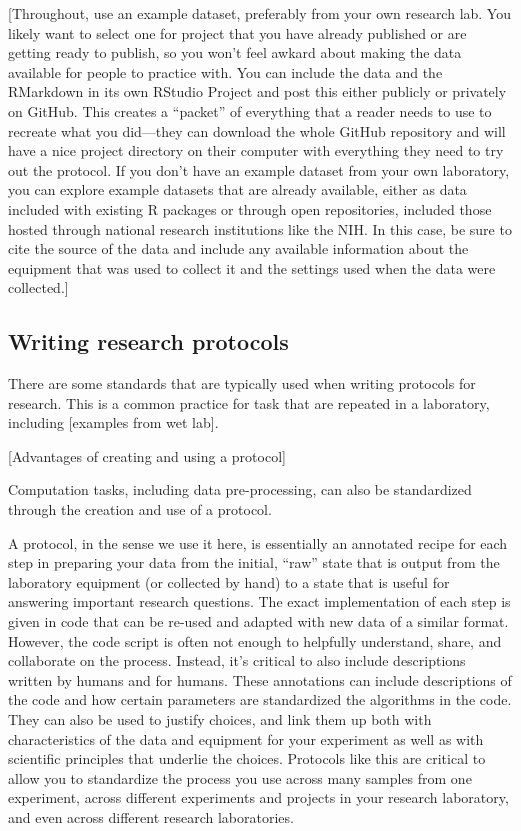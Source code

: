 \documentclass[]{tufte-book}
\begin{document}
{[}Throughout, use an example dataset, preferably from your own research lab. You
likely want to select one for project that you have already published or are
getting ready to publish, so you won't feel awkard about making the data
available for people to practice with. You can include the data and the
RMarkdown in its own RStudio Project and post this either publicly or privately
on GitHub. This creates a ``packet'' of everything that a reader needs to use to
recreate what you did---they can download the whole GitHub repository and will
have a nice project directory on their computer with everything they need to try
out the protocol. If you don't have an example dataset from your own laboratory,
you can explore example datasets that are already available, either as data
included with existing R packages or through open repositories, included those
hosted through national research institutions like the NIH. In this case, be
sure to cite the source of the data and include any available information about
the equipment that was used to collect it and the settings used when the data
were collected.{]}

\hypertarget{writing-research-protocols}{%
\subsection{Writing research protocols}\label{writing-research-protocols}}

There are some standards that are typically used when writing protocols for
research. This is a common practice for task that are repeated in a laboratory,
including {[}examples from wet lab{]}.

{[}Advantages of creating and using a protocol{]}

Computation tasks, including data pre-processing, can also be standardized
through the creation and use of a protocol.

A protocol, in the sense we use it here, is essentially an annotated
recipe for each step in preparing your data from the initial, ``raw'' state
that is output from the laboratory equipment (or collected by hand) to a
state that is useful for answering important research questions. The
exact implementation of each step is given in code that can be re-used and
adapted with new data of a similar format. However, the code script is
often not enough to helpfully understand, share, and collaborate on the
process. Instead, it's critical to also include descriptions written
by humans and for humans. These annotations can include descriptions of the
code and how certain parameters are standardized the algorithms in the code.
They can also be used to justify choices, and link them up both with
characteristics of the data and equipment for your experiment as well as
with scientific principles that underlie the choices. Protocols like this
are critical to allow you to standardize the process you use across many
samples from one experiment, across different experiments and projects in
your research laboratory, and even across different research laboratories.
\end{document}
